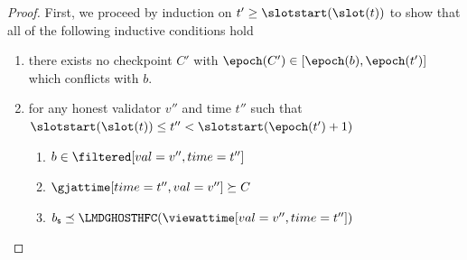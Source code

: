 \documentclass{article}
\begin{document}
\begin{proof}

    First, we proceed by induction on $t' \geq \slotstart(\slot(t))$ to show that all of the following inductive conditions hold
    \begin{enumerate}[label=\roman*)]
        \item there exists no checkpoint $C'$ with $\epoch(C') \in [\epoch(b), \epoch(t')]$ which conflicts with $b$. \label{lem:ffg-safety-from-sir:safety-cond-1}
        \item\label{lem:ffg-safety-from-sir:safety-cond-2} for any honest validator $v''$ and time $t''$ such that $\slotstart(\slot(t)) \leq t'' < \slotstart(\epoch(t')+1)$
        \begin{enumerate}[label=\roman{enumi}.\roman*)]
            \item $b \in \filtered[val=v'',time=t'']$\label{lem:ffg-safety-from-sir:safety-cond-2.1}
            \item $\gjattime[time=t'',val=v''] \succeq C$\label{lem:ffg-safety-from-sir:safety-cond-2.2}
            \item $b_\mathsf{s} \preceq  \LMDGHOSTHFC(\viewattime[val=v'',time=t''])$ \label{lem:ffg-safety-from-sir:safety-cond-2.3}
        \end{enumerate}

    \end{enumerate}



\end{proof}
\end{document}
